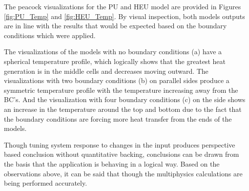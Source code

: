\documentclass{anstrans}
\begin{document}
The peacock visualizations for the PU and HEU model are provided in Figures \ref{fig:PU_Temp} and \ref{fig:HEU_Temp}. By visual inspection, both models outputs are in line with the results that would be expected based on the boundary conditions which were applied. 

The visualizations of the models with no boundary conditions (a) have a spherical temperature profile, which logically shows that the greatest heat generation is in the middle cells and decreases moving outward. The visualizations with two boundary conditions (b) on parallel sides produce a symmetric temperature profile with the temperature increasing away from the BC's. And the visualization with four boundary conditions (c) on the side shows an increase in the temperature around the top and bottom due to the fact that the boundary conditions are forcing more heat transfer from the ends of the models. 

Though tuning system response to changes in the input produces perspective based conclusion without quantitative backing, conclusions can be drawn from the basis that the application is behaving in a logical way. Based on the observations above, it can be said that though the multiphysics calculations are being performed accurately.
\end{document}
